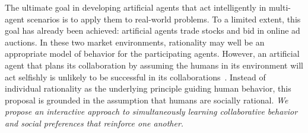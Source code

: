 The ultimate goal in developing artificial agents that act
intelligently in multi-agent scenarios is to apply them to real-world
problems.  To a limited extent, this goal has already been achieved:
artificial agents trade stocks and bid in online ad auctions.  In
these two market environments, rationality may well be an appropriate
model of behavior for the participating agents.  However,
an artificial agent that plans its collaboration by assuming the
humans in its environment will act selfishly is unlikely to be
successful in its collaborations~\cite{Camerer:2003,kahnemanst82}.
Instead of individual rationality as the underlying principle guiding
human behavior, this proposal is grounded in the assumption that
humans are socially rational.  \emph{We propose an interactive
  approach to simultaneously learning collaborative behavior and
  social preferences that reinforce one another.}

